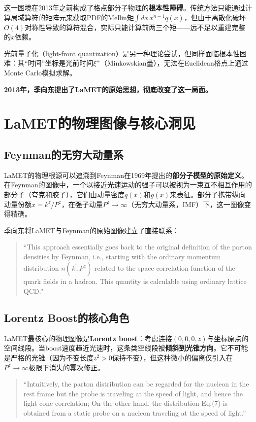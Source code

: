 \documentclass[12pt,a4paper]{ctexart}
\theoremstyle{definition}
\begin{document}
这一困境在2013年之前构成了格点部分子物理的\textbf{根本性障碍}。传统方法只能通过计算局域算符的矩阵元来获取PDF的Mellin矩$\int dx\, x^{n-1}q(x)$，但由于离散化破坏$O(4)$对称性导致的算符混合，实际只能计算前两三个矩——远不足以重建完整的$x$依赖。

光前量子化（light-front quantization）是另一种理论尝试，但同样面临根本性困难：其``时间''坐标是光前时间$\xi^+$（Minkowskian量），无法在Euclidean格点上通过Monte Carlo模拟求解。

\textbf{2013年，季向东提出了LaMET的原始思想，彻底改变了这一局面。}

\section{LaMET的物理图像与核心洞见}

\subsection{Feynman的无穷大动量系}

LaMET的物理根源可以追溯到Feynman在1969年提出的\textbf{部分子模型的原始定义}\cite{Ji2014LaMET}。在Feynman的图像中，一个以接近光速运动的强子可以被视为一束互不相互作用的部分子（夸克和胶子），它们由动量密度$q(x)$和$g(x)$来表征。部分子携带纵向动量份额$x = k^z/P^z$，在强子动量$P^z \to \infty$（无穷大动量系，IMF）下，这一图像变得精确。

季向东\cite{Ji2014LaMET}将LaMET与Feynman的原始图像建立了直接联系：

\begin{quote}
``This approach essentially goes back to the original definition of the parton densities by Feynman, i.e., starting with the ordinary momentum distribution $n(\vec{k}, P^z)$ related to the space correlation function of the quark fields in a hadron. This quantity is calculable using ordinary lattice QCD.''
\end{quote}

\subsection{Lorentz Boost的核心角色}

LaMET最核心的物理图像是\textbf{Lorentz boost}：考虑连接$(0,0,0,z)$与坐标原点的空间线段。当boost速度趋近光速时，这条类空线段被\textbf{倾斜到光锥方向}\cite{Ji2013Euclidean}。它不可能是严格的光锥（因为不变长度$z^2 > 0$保持不变），但这种微小的偏离仅引入在$P^z \to \infty$极限下消失的幂次修正。

\begin{quote}
``Intuitively, the parton distribution can be regarded for the nucleon in the rest frame but the probe is traveling at the speed of light, and hence the light-cone correlation; On the other hand, the distribution Eq.(7) is obtained from a static probe on a nucleon traveling at the speed of light.''\cite{Ji2013Euclidean}
\end{quote}
\end{document}

